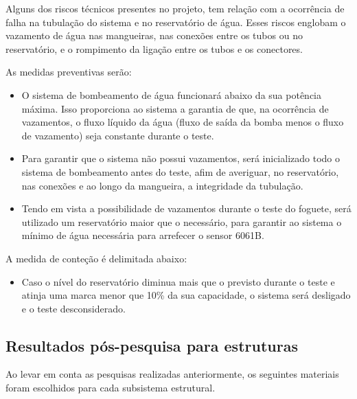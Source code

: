 Alguns dos riscos técnicos presentes no projeto, tem relação com a ocorrência de falha na tubulação do sistema e no reservatório de água. Esses riscos englobam o vazamento de água nas mangueiras, nas conexões entre os tubos ou no reservatório, e o rompimento da ligação entre os tubos e os conectores.

As medidas preventivas serão:

\begin{itemize}
\item O sistema de bombeamento de água funcionará abaixo da sua potência máxima. Isso proporciona ao sistema a garantia de que, na ocorrência de vazamentos, o fluxo líquido da água (fluxo de saída da bomba menos o fluxo de vazamento) seja constante durante o teste.
\item Para garantir que o sistema não possui vazamentos, será inicializado todo o sistema de bombeamento antes do teste, afim de averiguar, no reservatório, nas conexões e ao longo da mangueira, a integridade da tubulação.
\item Tendo em vista a possibilidade de vazamentos durante o teste do foguete, será utilizado um reservatório maior que o necessário, para garantir ao sistema o mínimo de água necessária para arrefecer o sensor 6061B.
\end{itemize}

A medida de conteção é delimitada abaixo:

\begin{itemize}
\item Caso o nível do reservatório diminua mais que o previsto durante o teste e atinja uma marca menor que 10\% da sua capacidade, o sistema será desligado e o teste desconsiderado.
\end{itemize}

\newpage

\subsection{Resultados pós-pesquisa para estruturas}

Ao levar em conta as pesquisas realizadas anteriormente, os seguintes materiais foram escolhidos para cada subsistema estrutural.


